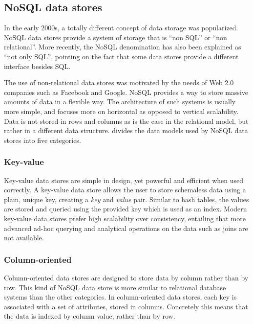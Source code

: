 \subsection{NoSQL data stores}
\label{sec:nosql-data-stores}

In the early 2000s, a totally different concept of data storage was popularized. NoSQL data stores provide a system of storage that is ``non SQL'' or ``non relational''. More recently, the NoSQL denomination has also been explained as ``not only SQL'', pointing on the fact that some data stores provide a different interface besides SQL.

The use of non-relational data stores was motivated by the needs of Web 2.0 companies such as Facebook and Google. NoSQL provides a way to store massive amounts of data in a flexible way. The architecture of such systems is usually more simple, and focuses more on horizontal as opposed to vertical scalability. Data is not stored in rows and columns as is the case in the relational model, but rather in a different data structure. \textcite{Nayak2013} divides the data models used by NoSQL data stores into five categories.

\subsubsection{Key-value}
\label{sec:key-value}

Key-value data stores are simple in design, yet powerful and efficient when used correctly. A key-value data store allows the user to store schemaless data using a plain, unique key, creating a \textit{key} and \textit{value} pair. Similar to hash tables, the values are stored and queried using the provided key which is used as an index. Modern key-value data stores prefer high scalability over consistency, entailing that more advanced ad-hoc querying and analytical operations on the data such as joins are not available.

\subsubsection{Column-oriented}
\label{sec:column-oriented}

Column-oriented data stores are designed to store data by column rather than by row. This kind of NoSQL data store is more similar to relational database systems than the other categories. In column-oriented data stores, each key is associated with a set of attributes, stored in columns. Concretely this means that the data is indexed by column value, rather than by row.


